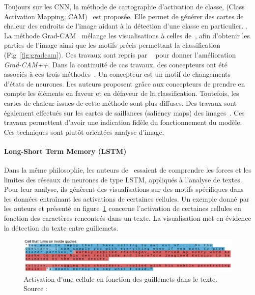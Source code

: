 Toujours sur les CNN, la méthode de cartographie d'activation de classe, (Class Activation Mapping, CAM)~\cite{Zhou2016} est proposée. Elle permet de générer des cartes de chaleur des endroits de l'image aidant à la détection d'une classe en particulier.   .
La méthode Grad-CAM~\cite{Selvaraju2017} mélange les visualisations à celles de~\cite{Springenberg2015,Zeiler2014}, afin d'obtenir les parties de l'image ainsi que les motifs précis permettant la classification (Fig~\ref{fig:gradcam}).
Ces travaux sont repris par ~\cite{Chattopadhay2018} pour donner l'amélioration \textit{Grad-CAM++}.
Dans la continuité de cas travaux, des concepteurs ont été associés à ces trois méthodes~\cite{Qian2022}. Un concepteur est un motif de changements d'états de neurones. Les auteurs proposent grâce aux concepteurs de prendre en compte les éléments en faveur et en défaveur de la classification. Toutefois, les cartes de chaleur issues de cette méthode sont plus diffuses.
Des travaux sont également effectués sur les cartes de saillances (saliency maps) des images~\cite{Simonyan2014}. Ces travaux permettent d'avoir une indication fidèle du fonctionnement du modèle. Ces techniques sont plutôt orientées analyse d'image.

\paragraph{Long-Short Term Memory (LSTM)}
Dans la même philosophie, les auteurs de~\cite{Karpathy2016} essaient de comprendre les forces et les limites des réseaux de neurones de type LSTM, appliqués à l'analyse de textes.
Pour leur analyse, ils génèrent des visualisations sur des motifs spécifiques dans les données entraînant les activations de certaines cellules. Un exemple donné par les auteurs et présenté en figure~\ref{fig:lstm_quotes} concerne l'activation de certaines cellules en fonction des caractères rencontrés dans un texte. La visualisation met en évidence la détection du texte entre guillemets.

\begin{figure}[htpb!]
\centering
\includegraphics[width=\textwidth]{S1-Comment_evaluer_une_explication/figures/lstm_quotes_activation.png}
\caption{Activation d'une cellule en fonction des guillemets dans le texte. Source :~\cite{Karpathy2016}}
\label{fig:lstm_quotes}
\end{figure}

